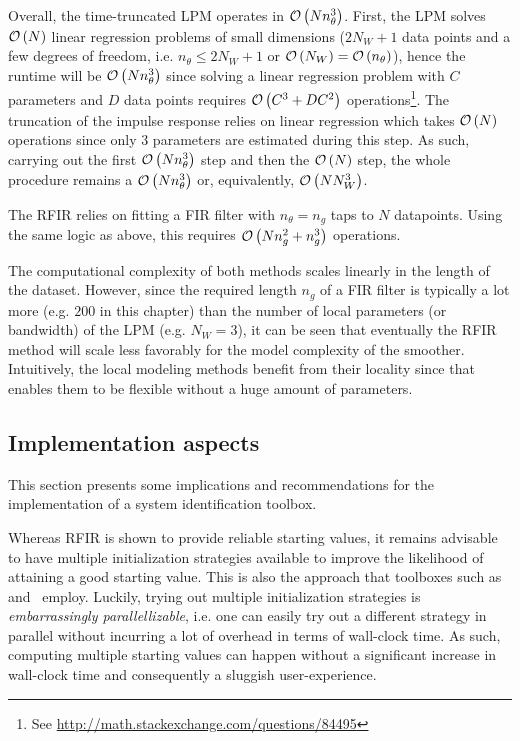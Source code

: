 
Overall, the time-truncated \gls{LPM} operates in $\mathcal{O} \left( N n_{\theta}^{3} \right)$.
First, the \gls{LPM} solves $\mathcal{O} \left( N \right)$ linear regression problems of small dimensions ($2N_W + 1$ data points and a few degrees of freedom, i.e. $n_{\theta} \leq 2 N_W + 1$ or $\mathcal{O} \left( N_W \right) = \mathcal{O} \left( n_{\theta} \right)$), hence the runtime will be $\mathcal{O} \left( N n_{\theta}^3 \right)$ since solving a linear regression problem with $C$ parameters and $D$ data points requires $\mathcal{O} \left( C^3  + D C^2 \right)$ operations\footnote{See \url{http://math.stackexchange.com/questions/84495}}.
The truncation of the impulse response relies on linear regression which takes $\mathcal{O} \left( N \right)$ operations since only $3$ parameters are estimated during this step.
As such, carrying out the first $\mathcal{O} \left( N n_{\theta}^3 \right)$ step and then the $\mathcal{O} \left( N \right)$ step, the whole procedure remains a $\mathcal{O} \left( N n_{\theta}^3 \right)$ or, equivalently, $\mathcal{O} \left( N N_W^3 \right)$.

The \gls{RFIR} relies on fitting a \gls{FIR} filter with $n_{\theta} = n_g$ taps to $N$ datapoints.
Using the same logic as above, this requires $\mathcal{O} \left( N n_{g}^2 + n_g^3 \right)$ operations.

The computational complexity  of both methods scales linearly in the length of the dataset.
However, since the required length $n_g$ of a \gls{FIR} filter is typically a lot more (e.g. $200$ in this chapter) than the number of local parameters (or bandwidth) of the \gls{LPM} (e.g. $N_W = 3$), it can be seen that eventually the \gls{RFIR} method will scale less favorably for the model complexity of the smoother.
Intuitively, the local modeling methods benefit from their locality since that enables them to be flexible without a huge amount of parameters.

\subsection{Implementation aspects}
This section presents some implications and recommendations for the implementation of  a system identification toolbox.

Whereas \gls{RFIR} is shown to provide reliable starting values, it remains advisable to have multiple initialization strategies available to improve the likelihood of attaining a good starting value.
This is also the approach that toolboxes such as~\citep{FDIDENT} and~\citep{TDIDENT} employ.
Luckily, trying out multiple initialization strategies is \emph{embarrassingly parallellizable}, i.e. one can easily try out a different strategy in parallel without incurring a lot of overhead in terms of wall-clock time.
As such, computing multiple starting values can happen without a significant increase in wall-clock time and consequently a sluggish user-experience.

